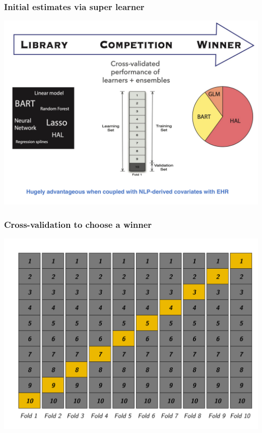 \documentclass[t]{beamer}
\begin{document}
\begin{frame}
\frametitle{Initial estimates via super learner}
\vspace{-15pt}
\begin{center}
\includegraphics[width = 1\textwidth]{figures/SL.pdf}
\end{center}
\end{frame}

\begin{frame}
\frametitle{Cross-validation to choose a winner}
\vspace{-15pt}
\begin{center}
\includegraphics[width = 1\textwidth]{figures/vs.png}
\end{center}
\end{frame}
\end{document}
